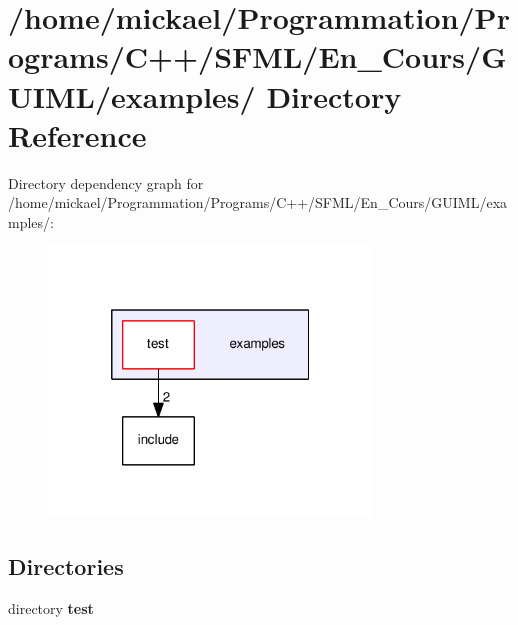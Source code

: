 \section{/home/mickael/\-Programmation/\-Programs/\-C++/\-S\-F\-M\-L/\-En\-\_\-\-Cours/\-G\-U\-I\-M\-L/examples/ Directory Reference}
\label{dir_3cc96a1a59bfcb18adaff007fc7fd000}
Directory dependency graph for /home/mickael/\-Programmation/\-Programs/\-C++/\-S\-F\-M\-L/\-En\-\_\-\-Cours/\-G\-U\-I\-M\-L/examples/\-:\nopagebreak
\begin{figure}[H]
\begin{center}
\leavevmode
\includegraphics[width=244pt]{dir_3cc96a1a59bfcb18adaff007fc7fd000_dep}
\end{center}
\end{figure}
\subsection*{Directories}
\begin{DoxyCompactItemize}
\item 
directory {\bf test}
\end{DoxyCompactItemize}
